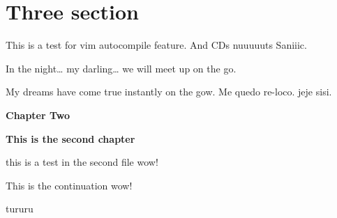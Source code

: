 \documentclass[
  10pt,
  a4paper,
  onecolumn,
  twoside]{article}
\begin{document}
\hypertarget{three-section}{%
\section{Three section}\label{three-section}}

This is a test for vim autocompile feature. And CDs nuuuuuts Saniiic.

In the night\ldots{} my darling\ldots{} we will meet up on the go.

My dreams have come true instantly on the gow. Me quedo re-loco. jeje
sisi.


\renewcommand{\maketitle}{
  \thispagestyle{firstpage}  
    \Huge
    \textbf{Chapter Two}
    \par
    \vspace{1cm}
    \large
    \textbf{This is the second chapter}
    \par
    \vspace{3\parskip}
}

\newpage

  \thispagestyle{firstpage}  
    \Huge
    \textbf{Chapter Two}
    \par
    \vspace{1cm}
    \large
    \textbf{This is the second chapter}
    \par
    \vspace{3\parskip}


\pagestyle{fancy}

\lipsum[1-10]

this is a test in the second file wow!

This is the continuation wow!

tururu

\end{document}
